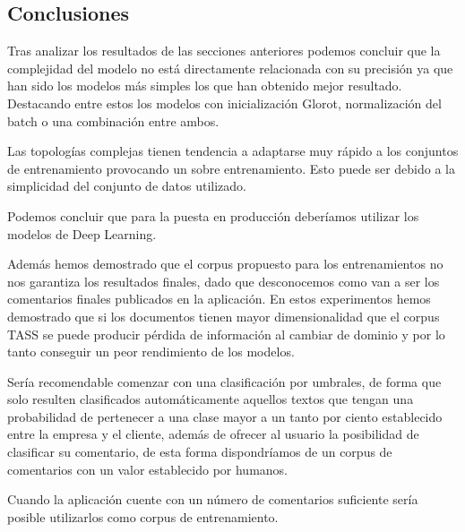 \subsection{Conclusiones}

Tras analizar los resultados de las secciones anteriores podemos concluir que la complejidad del modelo no está directamente relacionada con su precisión ya que han sido los modelos más simples los que han obtenido mejor resultado. Destacando entre estos los modelos con inicialización Glorot, normalización del batch o una combinación entre ambos.

Las topologías complejas tienen tendencia a adaptarse muy rápido a los conjuntos de entrenamiento provocando un sobre entrenamiento. Esto puede ser debido a la simplicidad del conjunto de datos utilizado.

Podemos concluir que para la puesta en producción deberíamos utilizar los modelos de Deep Learning.

Además hemos demostrado que el corpus propuesto para los entrenamientos no nos garantiza los resultados finales, dado que desconocemos como van a ser los comentarios finales publicados en la aplicación. En estos experimentos hemos demostrado que si los documentos tienen mayor dimensionalidad que el corpus TASS se puede producir pérdida de información al cambiar de dominio y por lo tanto conseguir un peor rendimiento de los modelos.

Sería recomendable comenzar con una clasificación por umbrales, de forma que solo resulten clasificados automáticamente aquellos textos que tengan una probabilidad de pertenecer a una clase mayor a un tanto por ciento establecido entre la empresa y el cliente, además de ofrecer al usuario la posibilidad de clasificar su comentario, de esta forma dispondríamos de un corpus de comentarios con un valor establecido por humanos.

Cuando la aplicación cuente con un número de comentarios suficiente sería posible utilizarlos como corpus de entrenamiento.




